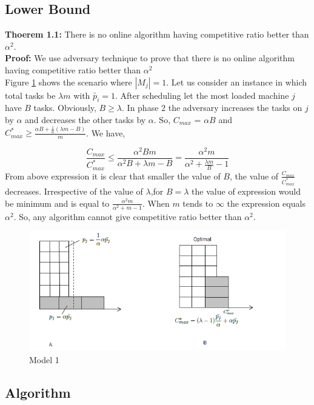 \documentclass[10pt, conference, compsocconf]{IEEEtran}
\begin{document}
                                                                                      
\subsection{Lower Bound}
\textbf{Thoerem 1.1:} There is no online algorithm having competitive  ratio better than $\alpha^{2} $.\\
\textbf{Proof:}  We  use adversary technique to prove that there is no online algorithm having competitive  ratio better than $\alpha^{2} $\\
 
Figure \ref{fig:rara} shows the scenario where $|M_j|=1$.  Let us consider an instance in which total tasks be $\lambda m$ with $\tilde{p_i}=1$. After scheduling let the most loaded machine $j$ have $B$ tasks. Obviously, $B \geq \lambda$. In phase 2 the adversary  increases the tasks on $j$ by $\alpha$ and decreases the other tasks by $\alpha$. So, $ C_{max}$ = $\alpha B$ and ${C^{*}_{max}}\geq \frac{\alpha B + \frac{1}{\alpha }  (\lambda  m - B) }{m}$. We have,
 
 \begin{equation}\nonumber
\frac{C_{max}}{C^{*}_{max}}\leq \frac{\alpha^{2} B m }{\alpha^{2} B + \lambda m - B}=\frac{\alpha^{2}  m }{\alpha^{2}  + \frac{\lambda m}{B}  - 1}
 \end{equation} 
  From above expression it is clear that smaller the value of $B$, the value of $\frac{C_{max}}{C^{*}_{max}}$ decreases.  Irrespective of the value of $\lambda$,for $B= \lambda$ the value of expression would be minimum and is equal to $\frac{\alpha^{2}  m }{\alpha^{2}  + m  - 1}$. When $m$ tends to $\infty$ the expression equals $\alpha^2$. So, any algorithm   cannot give competitive ratio better than $\alpha^2$.
  
  \begin{figure}[htp]
  \centering
  \includegraphics[width= 8 cm]{fig1}
  \caption{ Model 1  }
  \label{fig:rara}
  \end{figure}
 
 
 
\subsection{Algorithm}
\end{document}

